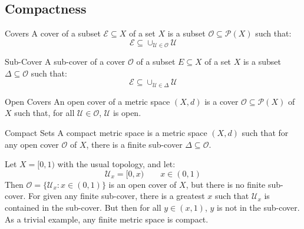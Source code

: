 \documentclass[crop=false,class=article,oneside]{standalone}
\begin{document}
        \subsection{Compactness}
            \begin{ldefinition}{Covers}
                A cover of a subset $\mathcal{E}\subseteq{X}$ of a set $X$
                is a subset $\mathcal{O}\subseteq\mathcal{P}(X)$ such that:
                \begin{equation}
                    \mathcal{E}\subseteq\cup_{\mathcal{U}\in\mathcal{O}}
                        \mathcal{U}
                \end{equation}
            \end{ldefinition}
            \begin{ldefinition}{Sub-Cover}
                A sub-cover of a cover $\mathcal{O}$ of a subset
                $E\subseteq{X}$ of a set $X$ is a subset
                $\Delta\subseteq\mathcal{O}$ such that:
              \begin{equation}
                    \mathcal{E}\subseteq\cup_{\mathcal{U}\in\Delta}
                        \mathcal{U}
                \end{equation}
            \end{ldefinition}
            \begin{ldefinition}{Open Covers}
                An open cover of a metric space $(X,d)$ is a cover
                $\mathcal{O}\subseteq\mathcal{P}(X)$ of $X$ such that, for all
                $\mathcal{U}\in\mathcal{O}$, $\mathcal{U}$ is open.
            \end{ldefinition}
            \begin{ldefinition}{Compact Sets}
                A compact metric space is a metric space $(X,d)$ such that
                for any open cover $\mathcal{O}$ of $X$, there is a finite
                sub-cover $\Delta\subseteq\mathcal{O}$.
            \end{ldefinition}
            \begin{lexample}
                Let $X=[0,1)$ with the usual topology, and let:
                \begin{equation}
                    \mathcal{U}_{x}=[0,x)
                    \quad\quad
                    x\in(0,1)
                \end{equation}
                Then $\mathcal{O}=\{\mathcal{U}_{x}:x\in(0,1)\}$ is an
                open cover of $X$, but there is no finite sub-cover.
                For given any finite sub-cover, there is a greatest $x$
                such that $\mathcal{U}_{x}$ is contained in the sub-cover.
                But then for all $y\in(x,1)$, $y$ is not in the sub-cover.
                As a trivial example, any finite metric space is compact.
            \end{lexample}
\end{document}
